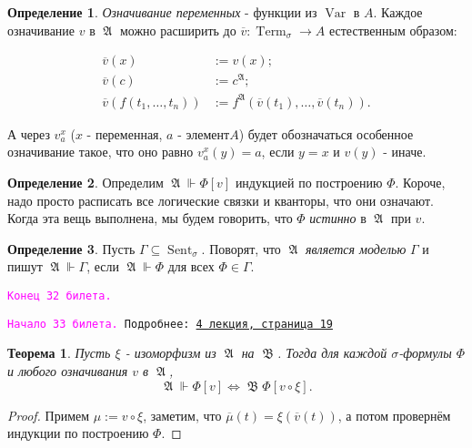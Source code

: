 \documentclass[a4paper,100pt]{article}
\theoremstyle{indented}
\newtheorem{theorem}{Теорема}
\theoremstyle{definition}
\newtheorem{defn}{Определение}
\theoremstyle{remark}
\DeclareMathOperator{\ra}{\rightarrow}
\DeclareMathOperator{\Llra}{\Longleftrightarrow}
\DeclareMathOperator{\Var}{Var}
\DeclareMathOperator{\Term}{Term}
\DeclareMathOperator{\Sent}{Sent}
\DeclareMathOperator{\GA}{\mathfrak{A}}
\DeclareMathOperator{\GB}{\mathfrak{B}}
\begin{document}
\begin{defn}
  \textit{Означивание переменных} - функции из $\Var$ в $A$. Каждое означивание $v$ в $\GA$ можно расширить до $\overline{v}:\Term_\sigma \ra A$ естественным образом: 

  \begin{equation*}
    \begin{aligned}
      \overline{v}(x) & := v(x); \\ 
      \overline{v}(c) & := c^{\GA}; \\
      \overline{v}(f(t_1, \ldots, t_n)) & := f^{\GA}(\overline{v}(t_1), \ldots, \overline{v}(t_n)).
    \end{aligned}
  \end{equation*}

  А через $v^x_a$  ($x$ - переменная, $a$ - элемент$A$) будет обозначаться особенное означивание такое, что оно равно $v^x_a(y)=a$, если $y=x$ и $v(y)$ - иначе.
\end{defn}

\begin{defn}
  Определим $\GA \Vdash \Phi[v]$ индукцией по построению $\Phi$. Короче, надо просто расписать все логические связки и кванторы, что они означают. Когда эта вещь выполнена, мы будем говорить, что $\Phi$ \textit{истинно} в $\GA$ при $v$. 
\end{defn}

\begin{defn}
  Пусть $\Gamma \subseteq \Sent_\sigma$. Поворят, что $\GA$ \textit{является моделью} $\Gamma$ и пишут $\GA \Vdash \Gamma$, если $\GA \Vdash \Phi$ для всех $\Phi\in \Gamma$. 
\end{defn}

\texttt{\textcolor{magenta}{Конец 32 билета.}} 

\hrulefill

\texttt{\hypertarget{b33}{\textcolor{magenta}{Начало 33 билета.}} Подробнее: \href{http://www.mi-ras.ru/~speranski/courses/logic-1-2021-spring/slides_4.pdf}{4 лекция, страница 19}} \\

\begin{theorem}
  Пусть $\xi$ - изоморфизм из $\GA$ на $\GB$. Тогда для каждой $\sigma$-формулы $\Phi$ и любого означивания $v$ в $\GA$, 
  \[
    \GA \Vdash \Phi[v] \Llra \GB \Phi[v\circ \xi]. 
  \]
\end{theorem}

\begin{proof}
  Примем $\mu:=v\circ \xi$, заметим, что $\overline{\mu}(t) = \xi (\overline{v}(t))$, а потом провернём индукции по построению $\Phi$. 
\end{proof}
\end{document}
